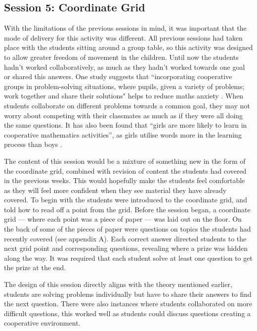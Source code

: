 \documentclass[11pt, a4paper, notitlepage]{article}
\begin{document}
\subsection{Session 5: Coordinate Grid}
With the limitations of the previous sessions in mind, it was important that the mode of delivery for this activity was different. All previous sessions had taken place with the students sitting around a group table, so this activity was designed to allow greater freedom of movement in the children. Until now the students hadn't worked collaboratively, as much as they hadn't worked towards one goal or shared this answers. One study suggests that ``incorporating cooperative groups in problem-solving situations, where pupils, given a  variety of problems; work together and share their solutions" helps to reduce maths anxiety \cite{Alkan:2013}. When students collaborate on different problems towards a common goal, they may not worry about competing with their classmates as much as if they were all doing the same questions. It has also been found that ``girls are more likely to learn in cooperative mathematics activities'', as girls utilise words more in the learning process than boys \cite{Hughes:2006}.
\par
The content of this session would be a mixture of something new in the form of the coordinate grid, combined with revision of content the students had covered in the previous weeks. This would hopefully make the students feel comfortable as they will feel more confident when they see material they have already covered. To begin with the students were introduced to the coordinate grid, and told how to read off a point from the grid. Before the session began, a coordinate grid --- where each point was a piece of paper --- was laid out on the floor. On the back of some of the pieces of paper were questions on topics the students had recently covered (see appendix A). Each correct answer directed students to the next grid point and corresponding questions, revealing where a prize was hidden along the way. It was required that each student solve at least one question to get the prize at the end. 
\par
The design of this session directly aligns with the theory mentioned earlier, students are solving problems individually but have to share their answers to find the next question. There were also instances where students collaborated on more difficult questions, this worked well as students could discuss questions creating a cooperative environment.
\end{document}
